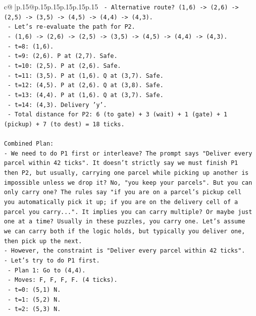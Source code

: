 \documentclass{article}
\begin{document}
{\begin{supertabular}{c@{$\;$}|p{.15\linewidth}@{}p{.15\linewidth}p{.15\linewidth}p{.15\linewidth}p{.15\linewidth}p{.15\linewidth}}
{{{\texttt{        {-} Alternative route? (1,6) {-}> (2,6) {-}> (2,5) {-}> (3,5) {-}> (4,5) {-}> (4,4) {-}> (4,3).} \\
\texttt{        {-} Let's re{-}evaluate the path for P2.} \\
\texttt{        {-} (1,6) {-}> (2,6) {-}> (2,5) {-}> (3,5) {-}> (4,5) {-}> (4,4) {-}> (4,3).} \\
\texttt{        {-} t=8: (1,6).} \\
\texttt{        {-} t=9: (2,6). P at (2,7). Safe.} \\
\texttt{        {-} t=10: (2,5). P at (2,6). Safe.} \\
\texttt{        {-} t=11: (3,5). P at (1,6). Q at (3,7). Safe.} \\
\texttt{        {-} t=12: (4,5). P at (2,6). Q at (3,8). Safe.} \\
\texttt{        {-} t=13: (4,4). P at (1,6). Q at (3,7). Safe.} \\
\texttt{        {-} t=14: (4,3). Delivery 'y'.} \\
\texttt{    {-} Total distance for P2: 6 (to gate) + 3 (wait) + 1 (gate) + 1 (pickup) + 7 (to dest) = 18 ticks.} \\
\\ 
\texttt{Combined Plan:} \\
\texttt{{-} We need to do P1 first or interleave? The prompt says "Deliver every parcel within 42 ticks". It doesn't strictly say we must finish P1 then P2, but usually, carrying one parcel while picking up another is impossible unless we drop it? No, "you keep your parcels". But you can only carry one? The rules say "if you are on a parcel's pickup cell you automatically pick it up; if you are on the delivery cell of a parcel you carry...". It implies you can carry multiple? Or maybe just one at a time? Usually in these puzzles, you carry one. Let's assume we can carry both if the logic holds, but typically you deliver one, then pick up the next.} \\
\texttt{{-} However, the constraint is "Deliver every parcel within 42 ticks".} \\
\texttt{{-} Let's try to do P1 first.} \\
\texttt{  {-} Plan 1: Go to (4,4).} \\
\texttt{    {-} Moves: F, F, F, F. (4 ticks).} \\
\texttt{    {-} t=0: (5,1) N.} \\
\texttt{    {-} t=1: (5,2) N.} \\
\texttt{    {-} t=2: (5,3) N.} \\
}}}
\end{supertabular}}
\end{document}
